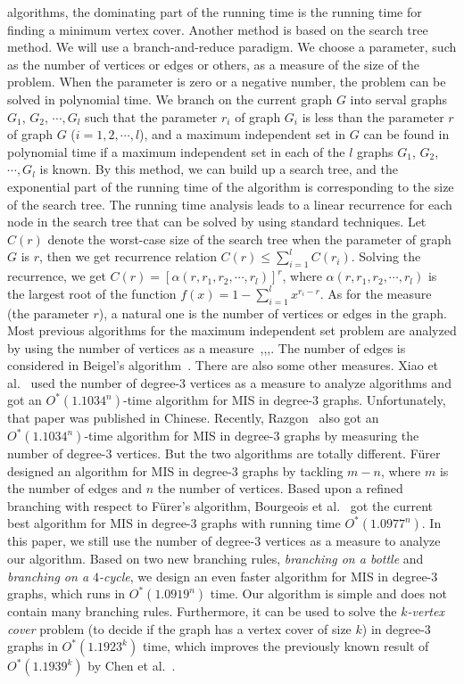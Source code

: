 \documentclass[runningheads]{llncs}
\begin{document}
algorithms, the dominating part of the running time is the running
time for finding a minimum vertex cover. Another method is based
on the search tree method. We will use a branch-and-reduce
paradigm. We choose a parameter, such as the number of vertices or
edges or others, as a measure of the size of the problem. When the
parameter is zero or a negative number, the problem can be solved
in polynomial time. We branch on the current graph $G$ into serval
graphs $G_1$, $G_2$, $\cdots, G_l$ such that the parameter $r_i$
of graph $G_i$ is less than the parameter $r$ of graph $G$
($i=1,2,\cdots, l$), and a maximum independent set in $G$ can be
found in polynomial time if a maximum independent set in each of
the $l$ graphs $G_1$, $G_2$, $\cdots, G_l$ is known. By this
method, we can build up a search tree, and the exponential part of
the running time of the algorithm is corresponding to the size of
the search tree. The running time analysis leads to a linear
recurrence for each node in the search tree that can be solved by
using standard techniques. Let $C(r)$ denote the worst-case size
of the search tree when the parameter of graph $G$ is $r$, then we
get recurrence relation $C(r)\leq \sum_{i=1}^l C(r_i)$. Solving
the recurrence, we get $C(r)=[\alpha(r, r_1, r_2, \cdots,
r_l)]^r$, where $\alpha(r, r_1, r_2, \cdots, r_l)$ is the largest
root of the function $f(x)=1-\sum_{i=1}^l x^{r_i-r}$. As for the
measure (the parameter $r$), a natural one is the number of
vertices or edges in the graph. Most previous algorithms for the
maximum independent set problem are analyzed by using the number
of vertices as a
measure~\cite{Tarjan:IS},\cite{Jian:Is},\cite{Robson:IS},\cite{Fomin:is}.
The number of edges is considered in Beigel's
algorithm~\cite{Beigel:is}. There are also some other measures.
Xiao et al.~\cite{xiao:IS3} used the number of degree-$3$ vertices
as a measure to analyze algorithms and got an $O^*(1.1034^n)$-time
algorithm for MIS in degree-$3$ graphs. Unfortunately, that paper
was published in Chinese. Recently, Razgon~\cite{Razgon:3IS} also
got an $O^*(1.1034^n)$-time algorithm for MIS in degree-$3$ graphs
by measuring the number of degree-$3$ vertices. But the two
algorithms are totally different. F{\"u}rer~\cite{Furer:ISsparse}
designed an algorithm for MIS in degree-$3$ graphs by tackling
$m-n$, where $m$ is the number of edges and $n$ the number of
vertices. Based upon a refined branching with respect to
F{\"u}rer's algorithm, Bourgeois et al.~\cite{Bourgeois:3IS} got
the current best algorithm for MIS in degree-$3$ graphs with
running time $O^*(1.0977^n)$. In this paper, we still use the
number of degree-$3$ vertices as a measure to analyze our
algorithm. Based on two new branching rules, \emph{branching on a
bottle} and \emph{branching on a $4$-cycle}, we design an even
faster algorithm for MIS in degree-$3$ graphs, which runs in
$O^*(1.0919^n)$ time. Our algorithm is simple and does not contain
many branching rules. Furthermore, it can be used to solve the
\emph{$k$-vertex cover} problem (to decide if the graph has a
vertex cover of size $k$) in degree-$3$ graphs in $O^*(1.1923^k)$
time, which improves the previously known result of
$O^*(1.1939^k)$ by Chen et al.~\cite{Chen:labeled3vc}.
\end{document}

